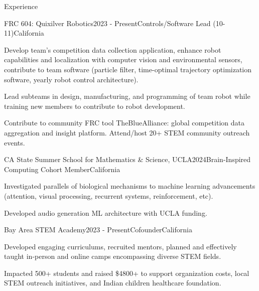 \documentclass[
  10pt, %
]{public/resume/resume} %
\begin{document}
\sloppy


\begin{rSection}{Experience}


  \begin{rSubsection}{FRC 604: Quixilver Robotics}{2023 - Present}{Controls/Software Lead (10-11)}{California}
    
    \item Develop team's competition data collection application, enhance robot capabilities and localization with computer vision and environmental sensors, contribute to team software (particle filter, time-optimal trajectory optimization software, yearly robot control architecture).
    
    \item Lead subteams in design, manufacturing, and programming of team robot while training new members to contribute to robot development.
    
    \item Contribute to community FRC tool TheBlueAlliance: global competition data aggregation and insight platform. Attend/host 20+ STEM community outreach events.
    
  \end{rSubsection}
        
  \begin{rSubsection}{CA State Summer School for Mathematics \& Science, UCLA}{2024}{Brain-Inspired Computing Cohort Member}{California}
    
    \item Investigated parallels of biological mechanisms to machine learning advancements (attention, visual processing, recurrent systems, reinforcement, etc).
    
    \item Developed audio generation ML architecture with UCLA funding.
    
  \end{rSubsection}
        
  \begin{rSubsection}{Bay Area STEM Academy}{2023 - Present}{Cofounder}{California}
    
    \item Developed engaging curriculums, recruited mentors, planned and effectively taught in-person and online camps encompassing diverse STEM fields.
    
    \item Impacted 500+ students and raised \$4800+ to support organization costs, local STEM outreach initiatives, and Indian children healthcare foundation.
    
  \end{rSubsection}
        
	
\end{rSection}
\end{document}
